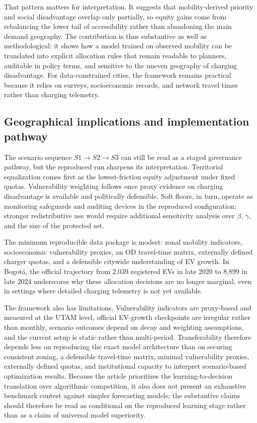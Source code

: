 \documentclass[final,5p,times,twocolumn,authoryear]{elsarticle}
\begin{document}
That pattern matters for interpretation. It suggests that mobility-derived priority and
social disadvantage overlap only partially, so equity gains come from rebalancing the lower
tail of accessibility rather than abandoning the main demand geography. The contribution is
thus substantive as well as methodological: it shows how a model trained on observed
mobility can be translated into explicit allocation rules that remain readable to planners,
auditable in policy terms, and sensitive to the uneven geography of charging disadvantage.
For data-constrained cities, the framework remains practical because it relies on surveys,
socioeconomic records, and network travel times rather than charging telemetry.

\subsection{Geographical implications and implementation pathway}

The scenario sequence $S1 \to S2 \to S3$ can still be read as a staged governance pathway,
but the reproduced run sharpens its interpretation. Territorial equalization comes first as
the lowest-friction equity adjustment under fixed quotas. Vulnerability weighting follows
once proxy evidence on charging disadvantage is available and politically defensible. Soft
floors, in turn, operate as monitoring safeguards and auditing devices in the reproduced
configuration; stronger redistributive use would require additional sensitivity analysis over
$\beta$, $\gamma$, and the size of the protected set.

The minimum reproducible data package is modest: zonal mobility indicators, socioeconomic
vulnerability proxies, an OD travel-time matrix, externally defined charger quotas, and a
defensible citywide understanding of EV growth. In Bogot\'a, the official trajectory from
2,039 registered EVs in late 2020 to 8,899 in late 2024 underscores why these allocation
decisions are no longer marginal, even in settings where detailed charging telemetry is not
yet available.

The framework also has limitations. Vulnerability indicators are proxy-based and measured at
the UTAM level, official EV-growth checkpoints are irregular rather than monthly, scenario
outcomes depend on decay and weighting assumptions, and the current setup is static rather
than multi-period. Transferability therefore depends less on reproducing the exact model
architecture than on securing consistent zoning, a defensible travel-time matrix, minimal
vulnerability proxies, externally defined quotas, and institutional capacity to interpret
scenario-based optimization results. Because the article prioritizes the learning-to-decision
translation over algorithmic competition, it also does not present an exhaustive benchmark
contest against simpler forecasting models; the substantive claims should therefore be read
as conditional on the reproduced learning stage rather than as a claim of universal model
superiority.
\end{document}
